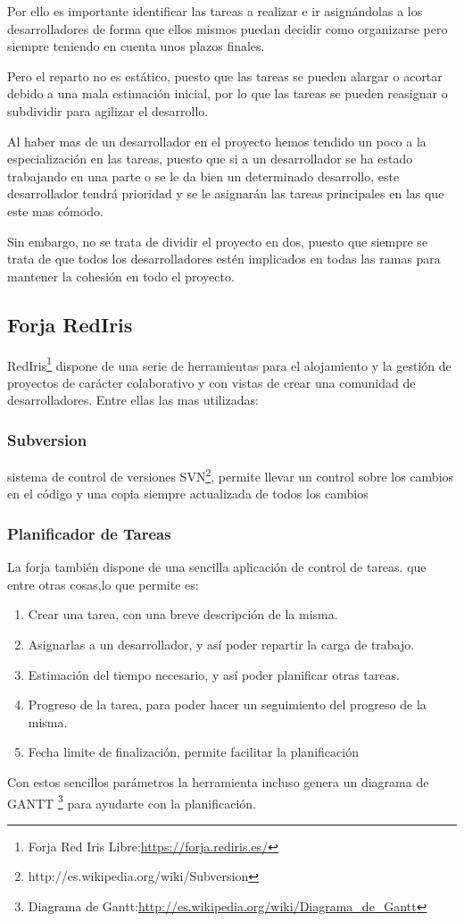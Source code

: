 Por ello es importante identificar las tareas a realizar e ir asignándolas a
los desarrolladores de forma que ellos mismos puedan decidir como organizarse
pero siempre teniendo en cuenta unos plazos finales.

Pero el reparto no es estático, puesto que las tareas se pueden alargar o
acortar debido a una mala estimación inicial, por lo que las tareas se pueden
reasignar o subdividir para agilizar el desarrollo.

Al haber mas de un desarrollador en el proyecto hemos tendido un poco a la
especialización en las tareas, puesto que si a un desarrollador se ha estado
trabajando en una parte o se le da bien un determinado desarrollo, este
desarrollador tendrá prioridad y se le asignarán las tareas principales en las
que este mas cómodo.

Sin embargo, no se trata de dividir el proyecto en dos, puesto que siempre se
trata de que todos los desarrolladores estén implicados en todas las ramas
para mantener la cohesión en todo el proyecto.

\subsection*{Forja RedIris}
RedIris\footnote{Forja Red Iris Libre:\url{https://forja.rediris.es/}} dispone
de una serie de
herramientas para el alojamiento y la gestión de proyectos de carácter
colaborativo y con vistas de crear una comunidad de desarrolladores.
Entre ellas las mas utilizadas:
\subsubsection*{Subversion}
sistema de control de versiones
SVN\footnote{http://es.wikipedia.org/wiki/Subversion}, permite llevar un
control sobre los cambios en el código y una copia siempre actualizada de
todos los cambios
\subsubsection*{Planificador de Tareas}
La forja también dispone de una sencilla aplicación de control de tareas.
que entre otras cosas,lo que permite es:
\begin{enumerate}
 \item Crear una tarea, con una breve descripción de la misma.
 \item Asignarlas a un desarrollador, y así poder repartir la carga de trabajo.
 \item Estimación del tiempo necesario, y así poder planificar otras tareas.
 \item Progreso de la tarea, para poder hacer un seguimiento del progreso de la
misma.
 \item Fecha limite de finalización, permite facilitar la planificación
\end{enumerate}
Con estos sencillos parámetros la herramienta incluso genera un diagrama de
GANTT
\footnote{Diagrama de
Gantt:\url{http://es.wikipedia.org/wiki/Diagrama_de_Gantt}} para ayudarte con
la planificación.

